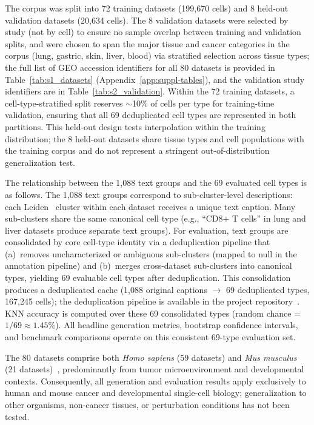 \documentclass[biology,article,submit,pdftex,moreauthors]{Definitions/mdpi}
\begin{document}
The corpus was split into 72 training datasets (199,670 cells) and 8 held-out validation datasets (20,634 cells). The 8 validation datasets were selected by study (not by cell) to ensure no sample overlap between training and validation splits, and were chosen to span the major tissue and cancer categories in the corpus (lung, gastric, skin, liver, blood) via stratified selection across tissue types; the full list of GEO accession identifiers for all 80 datasets is provided in Table~\ref{tab:s1_datasets} (Appendix~\ref{app:suppl-tables}), and the validation study identifiers are in Table~\ref{tab:s2_validation}. Within the 72 training datasets, a cell-type-stratified split reserves $\sim$10\% of cells per type for training-time validation, ensuring that all 69 deduplicated cell types are represented in both partitions. This held-out design tests interpolation within the training distribution; the 8 held-out datasets share tissue types and cell populations with the training corpus and do not represent a stringent out-of-distribution generalization test.

The relationship between the 1,088 text groups and the 69 evaluated cell types is as follows. The 1,088 text groups correspond to sub-cluster-level descriptions: each Leiden~\cite{ref-leiden} cluster within each dataset receives a unique text caption. Many sub-clusters share the same canonical cell type (e.g., ``CD8+ T cells'' in lung and liver datasets produce separate text groups). For evaluation, text groups are consolidated by core cell-type identity via a deduplication pipeline that (a)~removes uncharacterized or ambiguous sub-clusters (mapped to null in the annotation pipeline) and (b)~merges cross-dataset sub-clusters into canonical types, yielding 69 evaluable cell types after deduplication. This consolidation produces a deduplicated cache (1,088 original captions $\to$ 69 deduplicated types, 167,245 cells); the deduplication pipeline is available in the project repository~\cite{ref-clop-dit}. KNN accuracy is computed over these 69 consolidated types (random chance = $1/69 \approx 1.45\%$). All headline generation metrics, bootstrap confidence intervals, and benchmark comparisons operate on this consistent 69-type evaluation set.

The 80 datasets comprise both \textit{Homo sapiens} (59 datasets) and \textit{Mus musculus} (21 datasets)~\cite{ref-tabula-muris}, predominantly from tumor microenvironment and developmental contexts. Consequently, all generation and evaluation results apply exclusively to human and mouse cancer and developmental single-cell biology; generalization to other organisms, non-cancer tissues, or perturbation conditions has not been tested.
\end{document}
